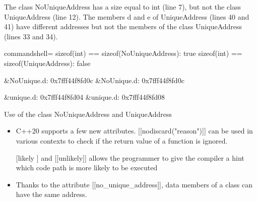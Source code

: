 The class NoUniqueAddress has a size equal to int (line 7), but not the class UniqueAddress (line 12). The members d and e of UniqueAddress (lines 40 and 41) have different addresses but not the members of the class UniqueAddress (lines 33 and 34).

\begin{tcblisting}{commandshell={}}
sizeof(int) == sizeof(NoUniqueAddress): true
sizeof(int) == sizeof(UniqueAddress): false

&NoUnique.d: 0x7fff44f8fd0c
&NoUnique.d: 0x7fff44f8fd0c

&unique.d: 0x7fff44f8fd04
&unique.d: 0x7fff44f8fd08
\end{tcblisting}

\begin{center}
Use of the class NoUniqueAddress and UniqueAddress
\end{center}


\begin{tcolorbox}[breakable,enhanced jigsaw,colback=mygreen!5!white,colframe=mygreen!75!black,title={Distilled Information}]
\begin{itemize}
\item 
C++20 supports a few new attributes. [[nodiscard("reason")]] can be used in various contexts to check if the return value of a function is ignored.

\item 
[[likely]] and [[unlikely]] allows the programmer to give the compiler a hint which code path is more likely to be executed
\item 
Thanks to the attribute [[no\_unique\_address]], data members of a class can have the same address.
\end{itemize}
\end{tcolorbox}

\newpage
















